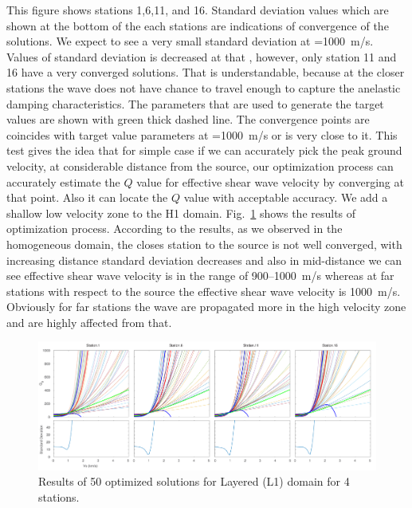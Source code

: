 This figure shows stations 1,6,11, and 16. Standard deviation values which are shown at the bottom of the each stations are indications of convergence of the solutions. We expect to see a very small standard deviation at \vs{}=1000~m/s. Values of standard deviation is decreased at that \vs{}, however,  only station 11 and 16 have a very converged solutions. That is understandable, because at the closer stations the wave does not have chance to travel enough to capture the anelastic damping characteristics. The parameters that are used to generate the target values are shown with green thick dashed line. The convergence points are coincides with target value parameters at \vs{}=1000~m/s or is very close to it. This test gives the idea that for simple case if we can accurately pick the peak ground velocity, at considerable distance from the source, our optimization process can accurately estimate the $Q$ value for effective shear wave velocity by converging at that point. Also it can locate the $Q$ value with acceptable accuracy.
We add a shallow low velocity zone to the H1 domain. Fig.~\ref{fig:station_1_1000_500_L1} shows the results of optimization process. According to the results, as we observed in the homogeneous domain, the closes station to the source is not well converged, with increasing distance standard deviation decreases and also in mid-distance we can see effective shear wave velocity is in the range of 900--1000~m/s whereas at far stations with respect to the source the effective shear wave velocity is 1000~m/s. Obviously for far stations the wave are propagated more in the high velocity zone and are highly affected from that.   

  \begin{figure}[ht]
    \centering
    \includegraphics[width=\textwidth]{figures/pdf/Figure_15-L1-pgv.pdf}
    \caption{Results of 50 optimized solutions for Layered (L1) domain for 4 stations.}
    \label{fig:station_1_1000_500_L1}
\end{figure}

